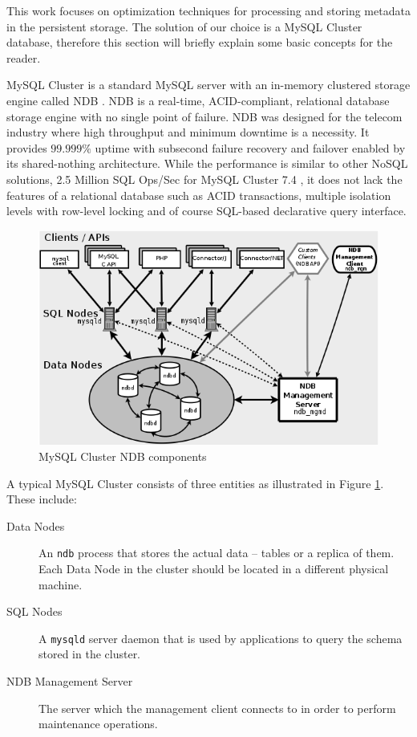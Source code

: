 This work focuses on optimization techniques for processing and
storing metadata in the persistent storage. The solution of our choice
is a MySQL Cluster database, therefore this section will briefly
explain some basic concepts for the reader.

MySQL Cluster is a standard MySQL server with an in-memory clustered
storage engine called NDB
\cite{Ronstrom:2005:RPM:1083592.1083720}. NDB is a real-time,
ACID-compliant, relational database storage engine with no single
point of failure. NDB was designed for the telecom industry where high
throughput and minimum downtime is a necessity. It provides $99.999\%$
uptime with subsecond failure recovery and failover enabled by its
shared-nothing architecture. While the performance is similar to other
NoSQL solutions, 2.5 Million SQL Ops/Sec for MySQL Cluster 7.4 \cite{ndb_benchmark},
it does not lack the features of a relational
database such as ACID transactions, multiple isolation levels with
row-level locking and of course SQL-based declarative query interface.

\begin{figure}
\centering
\includegraphics[scale=0.7]{resources/images/Background/ndb_arch.png}
\caption{MySQL Cluster NDB components \cite{ndb_components}}
\label{fig:ndb_ndb_arch}
\end{figure}

A typical MySQL Cluster consists of three entities as illustrated in
Figure \ref{fig:ndb_ndb_arch}. These include:
\begin{description}
\item[Data Nodes] An \texttt{ndb} process that stores the actual data
  -- tables or a
  replica of them. Each Data Node in the cluster should be located in a
  different physical machine.
\item[SQL Nodes] A \texttt{mysqld} server daemon that is used by
  applications to query the schema stored in the cluster.
\item[NDB Management Server] The server which the management client
  connects to in order to perform maintenance operations.
\end{description}

